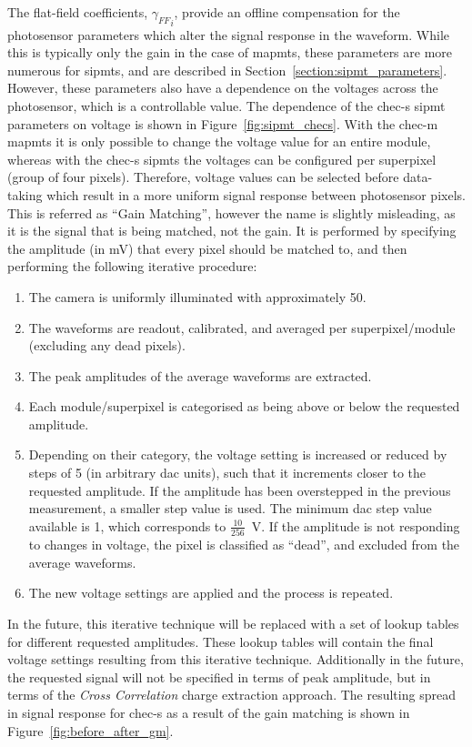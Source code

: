 The flat-field coefficients, ${\gamma_{FF}}_i$, provide an offline compensation for the photosensor parameters which alter the signal response in the waveform. While this is typically only the gain in the case of \glspl{mapmt}, these parameters are more numerous for \glspl{sipmt}, and are described in Section~\ref{section:sipmt_parameters}. However, these parameters also have a dependence on the voltages across the photosensor, which is a controllable value. The dependence of the \gls{chec-s} \gls{sipmt} parameters on voltage is shown in Figure~\ref{fig:sipmt_checs}. With the \gls{chec-m} \glspl{mapmt} it is only possible to change the voltage value for an entire module, whereas with the \gls{chec-s} \glspl{sipmt} the voltages can be configured per superpixel (group of four pixels). Therefore, voltage values can be selected before data-taking which result in a more uniform signal response between photosensor pixels. This is referred as ``Gain Matching'', however the name is slightly misleading, as it is the signal that is being matched, not the gain. It is performed by specifying the amplitude (in \si{mV}) that every pixel should be matched to, and then performing the following iterative procedure:
\begin{enumerate}
	\item The camera is uniformly illuminated with approximately \SI{50}{\pe}.
	\item The waveforms are readout, calibrated, and averaged per superpixel/module (excluding any dead pixels).
    \item The peak amplitudes of the average waveforms are extracted.
    \item Each module/superpixel is categorised as being above or below the requested amplitude.
    \item Depending on their category, the voltage setting is increased or reduced by steps of 5 (in arbitrary \gls{dac} units), such that it increments closer to the requested amplitude. If the amplitude has been overstepped in the previous measurement, a smaller step value is used. The minimum \gls{dac} step value available is 1, which corresponds to $\frac{10}{256}$~V. If the amplitude is not responding to changes in voltage, the pixel is classified as ``dead'', and excluded from the average waveforms.
    \item The new voltage settings are applied and the process is repeated.
\end{enumerate}

In the future, this iterative technique will be replaced with a set of lookup tables for different requested amplitudes. These lookup tables will contain the final voltage settings resulting from this iterative technique. Additionally in the future, the requested signal will not be specified in terms of peak amplitude, but in terms of the \textit{Cross Correlation} charge extraction approach. The resulting spread in signal response for \gls{chec-s} as a result of the gain matching is shown in Figure~\ref{fig:before_after_gm}.

